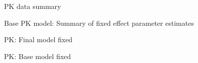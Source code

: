 % 
\begin{table}
    \centering
    \caption{PK data summary}
    
\end{table}

\begin{table}
    \centering
    \caption{Base PK model: Summary of fixed effect parameter estimates}
    
\end{table}

\begin{table}
    \centering
    \caption{PK: Final model fixed}
    
\end{table}

\begin{table}
    \centering
    \caption{PK: Base model fixed}
    
\end{table}
